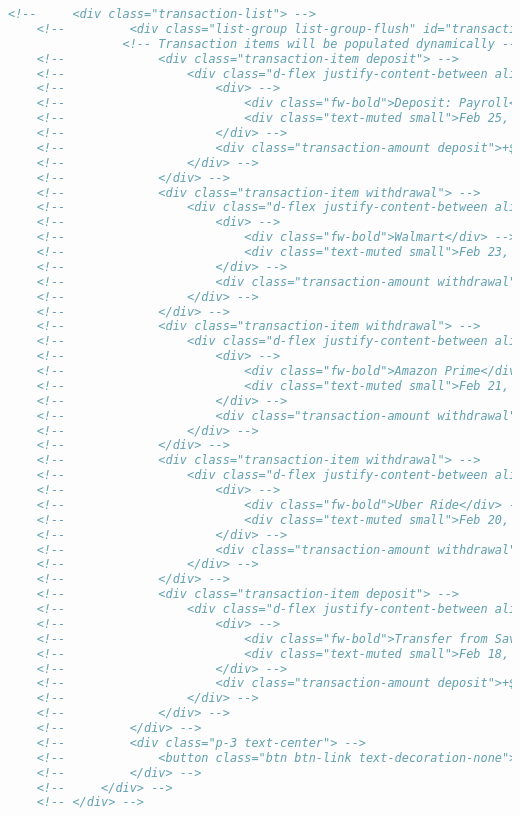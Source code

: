 \begin{lstlisting}[language=HTML]
    <!--     <div class="transaction-list"> -->
    <!--         <div class="list-group list-group-flush" id="transactionsList"> -->
                <!-- Transaction items will be populated dynamically -->
    <!--             <div class="transaction-item deposit"> -->
    <!--                 <div class="d-flex justify-content-between align-items-center"> -->
    <!--                     <div> -->
    <!--                         <div class="fw-bold">Deposit: Payroll</div> -->
    <!--                         <div class="text-muted small">Feb 25, 2025</div> -->
    <!--                     </div> -->
    <!--                     <div class="transaction-amount deposit">+$1,850.00</div> -->
    <!--                 </div> -->
    <!--             </div> -->
    <!--             <div class="transaction-item withdrawal"> -->
    <!--                 <div class="d-flex justify-content-between align-items-center"> -->
    <!--                     <div> -->
    <!--                         <div class="fw-bold">Walmart</div> -->
    <!--                         <div class="text-muted small">Feb 23, 2025</div> -->
    <!--                     </div> -->
    <!--                     <div class="transaction-amount withdrawal">-$87.45</div> -->
    <!--                 </div> -->
    <!--             </div> -->
    <!--             <div class="transaction-item withdrawal"> -->
    <!--                 <div class="d-flex justify-content-between align-items-center"> -->
    <!--                     <div> -->
    <!--                         <div class="fw-bold">Amazon Prime</div> -->
    <!--                         <div class="text-muted small">Feb 21, 2025</div> -->
    <!--                     </div> -->
    <!--                     <div class="transaction-amount withdrawal">-$14.99</div> -->
    <!--                 </div> -->
    <!--             </div> -->
    <!--             <div class="transaction-item withdrawal"> -->
    <!--                 <div class="d-flex justify-content-between align-items-center"> -->
    <!--                     <div> -->
    <!--                         <div class="fw-bold">Uber Ride</div> -->
    <!--                         <div class="text-muted small">Feb 20, 2025</div> -->
    <!--                     </div> -->
    <!--                     <div class="transaction-amount withdrawal">-$24.50</div> -->
    <!--                 </div> -->
    <!--             </div> -->
    <!--             <div class="transaction-item deposit"> -->
    <!--                 <div class="d-flex justify-content-between align-items-center"> -->
    <!--                     <div> -->
    <!--                         <div class="fw-bold">Transfer from Savings</div> -->
    <!--                         <div class="text-muted small">Feb 18, 2025</div> -->
    <!--                     </div> -->
    <!--                     <div class="transaction-amount deposit">+$500.00</div> -->
    <!--                 </div> -->
    <!--             </div> -->
    <!--         </div> -->
    <!--         <div class="p-3 text-center"> -->
    <!--             <button class="btn btn-link text-decoration-none">View All Transactions</button> -->
    <!--         </div> -->
    <!--     </div> -->
    <!-- </div> -->


\end{lstlisting}
